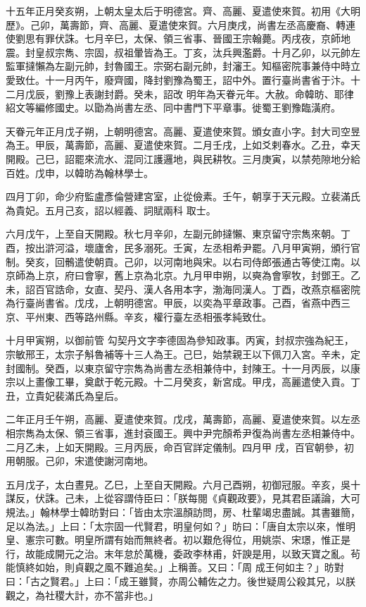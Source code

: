 \begin{pinyinscope}
 十五年正月癸亥朔，上朝太皇太后于明德宮。齊、高麗、夏遣使來賀。初用《大明歷》。己卯，萬壽節，齊、高麗、夏遣使來賀。六月庚戌，尚書左丞高慶裔、轉連使劉思有罪伏誅。七月辛巳，太保、領三省事、晉國王宗翰薨。丙戌夜，京師地震。封皇叔宗雋、宗固，叔祖暈皆為王。丁亥，汰兵興濫爵。十月乙卯，以元帥左監軍撻懶為左副元帥，封魯國王。宗弼右副元帥，封瀋王。知樞密院事兼侍中時立愛致仕。十一月丙午，廢齊國，降封劉豫為蜀王，詔中外。置行臺尚書省于汴。十二月戊辰，劉豫上表謝封爵。癸未，詔改
 明年為天眷元年。大赦。命韓昉、耶律紹文等編修國史。以勖為尚書左丞、同中書門下平章事。徙蜀王劉豫臨潢府。



 天眷元年正月戊子朔，上朝明德宮。高麗、夏遣使來賀。頒女直小字。封大司空昱為王。甲辰，萬壽節，高麗、夏遣使來賀。二月壬戌，上如爻剌春水。乙丑，幸天開殿。己巳，詔罷來流水、混同江護邏地，與民耕牧。三月庚寅，以禁苑隙地分給百姓。戊申，以韓昉為翰林學士。



 四月丁卯，命少府監盧彥倫營建宮室，止從儉素。壬午，朝享于天元殿。立裴滿氏為貴妃。五月己亥，詔以經義、詞賦兩科
 取士。



 六月戊午，上至自天開殿。秋七月辛卯，左副元帥撻懶、東京留守宗雋來朝。丁酉，按出滸河溢，壞廬舍，民多溺死。壬寅，左丞相希尹罷。八月甲寅朔，頒行官制。癸亥，回鶻遣使朝貢。己卯，以河南地與宋。以右司侍郎張通古等使江南。以京師為上京，府曰會寧，舊上京為北京。九月甲申朔，以奭為會寧牧，封鄧王。乙未，詔百官誥命，女直、契丹、漢人各用本字，渤海同漢人。丁酉，改燕京樞密院為行臺尚書省。戊戌，上朝明德宮。甲辰，以奕為平章政事。己酉，省燕中西三京、平州東、西等路州縣。辛亥，權行臺左丞相張孝純致仕。



 十月甲寅朔，以御前管
 勾契丹文字李德固為參知政事。丙寅，封叔宗強為紀王，宗敏邢王，太宗子斛魯補等十三人為王。己巳，始禁親王以下佩刀入宮。辛未，定封國制。癸酉，以東京留守宗雋為尚書左丞相兼侍中，封陳王。十一月丙辰，以康宗以上畫像工畢，奠獻于乾元殿。十二月癸亥，新宮成。甲戌，高麗遣使入貢。丁丑，立貴妃裴滿氏為皇后。



 二年正月壬午朔，高麗、夏遣使來賀。戊戌，萬壽節，高麗、夏遣使來賀。以左丞相宗雋為太保、領三省事，進封袞國王。興中尹完顏希尹復為尚書左丞相兼侍中。二月乙未，上如天開殿。三月丙辰，命百官詳定儀制。四月甲
 戌，百官朝參，初用朝服。己卯，宋遣使謝河南地。



 五月戊子，太白晝見。乙巳，上至自天開殿。六月己酉朔，初御冠服。辛亥，吳十謀反，伏誅。己未，上從容謂侍臣曰：「朕每閱《貞觀政要》，見其君臣議論，大可規法。」翰林學士韓昉對曰：「皆由太宗溫顏訪問，房、杜輩竭忠盡誠。其書雖簡，足以為法。」上曰：「太宗固一代賢君，明皇何如？」昉曰：「唐自太宗以來，惟明皇、憲宗可數。明皇所謂有始而無終者。初以艱危得位，用姚崇、宋璟，惟正是行，故能成開元之治。末年怠於萬機，委政李林甫，奸諛是用，以致天寶之亂。茍能慎終如始，則貞觀之風不難追矣。」上稱善。又曰：「周
 成王何如主？」昉對曰：「古之賢君。」上曰：「成王雖賢，亦周公輔佐之力。後世疑周公殺其兄，以朕觀之，為社稷大計，亦不當非也。」




\end{pinyinscope}
